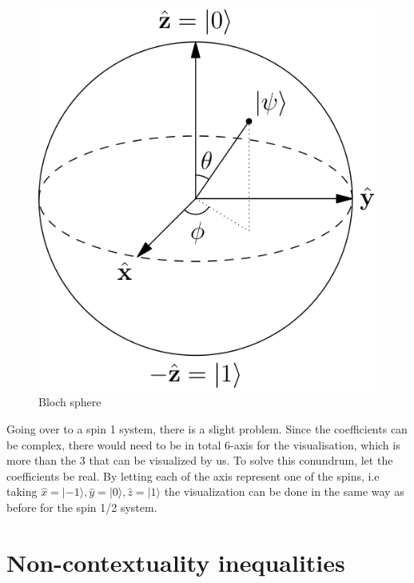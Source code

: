 \documentclass[
  utf8,%
  parskip,%
  largesmallcaps,intlimits,widermath,%
  sharecounter,nobreak,definition=marks,%
  noparts%
]{rtthesis}
\begin{document}
\begin{figure}[h]
\begin{center}
\includegraphics[scale=0.2]{Bloch_Sphere.png} 
\caption{Bloch sphere}
\label{fig:Bloch}
\end{center}
\end{figure}
Going over to a spin 1 system, there is a slight problem. Since the coefficients can be complex, there would need to be in total 6-axis for the visualisation, which is more than the 3 that can be visualized by us. To solve this conundrum, let the coefficients be real. By letting each of the axis represent one of the spins, i.e taking $\hat{x}=|-1\rangle, \hat{y}=|0\rangle, \hat{z}=|1\rangle$ the visualization can be done in the same way as before for the spin 1/2 system. 
\newpage
\section{Non-contextuality inequalities}\label{sec:intro:Noncontextuality inequalities}
\end{document}
